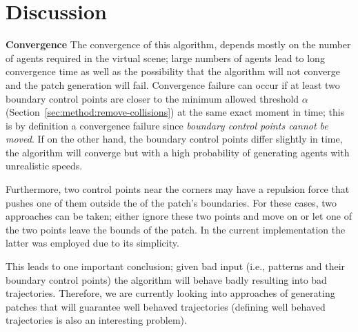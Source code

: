 \section{Discussion}
\label{sec:discussion}

\textbf{Convergence}
The convergence of this algorithm, depends mostly on the number of agents required in the virtual scene; large numbers of agents lead to long convergence time as well as the possibility that the algorithm will not converge and the patch generation will fail.
Convergence failure can occur if at least two boundary control points are closer to the minimum allowed threshold $\alpha$ (Section~\ref{sec:method:remove-collisions}) at the same exact moment in time; this is by definition a convergence failure since \emph{boundary control points cannot be moved}.
If on the other hand, the boundary control points differ slightly in time, the algorithm will converge but with a high probability of generating agents with unrealistic speeds.

% 

 Furthermore, two control points near the corners may have a repulsion force that pushes one of them outside the of the patch's boundaries.
For these cases, two approaches can be taken; either ignore these two points and move on or let one of the two points leave the bounds of the patch.
In the current implementation the latter was employed due to its simplicity.
 
 This leads to one important conclusion; given bad input (i.e., patterns and their boundary control points) the algorithm will behave badly resulting into bad trajectories.
 Therefore, we are currently looking into approaches of generating patches that will guarantee well behaved trajectories (defining well behaved trajectories is also an interesting problem).


